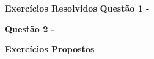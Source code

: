 \textbf{Exercícios Resolvidos}
    \vspace{0.5cm}\textbf{Questão 1 -}
    
    
    
    \vspace{0.5cm}\textbf{Questão 2 -}
    
    
\textbf{Exercícios Propostos}